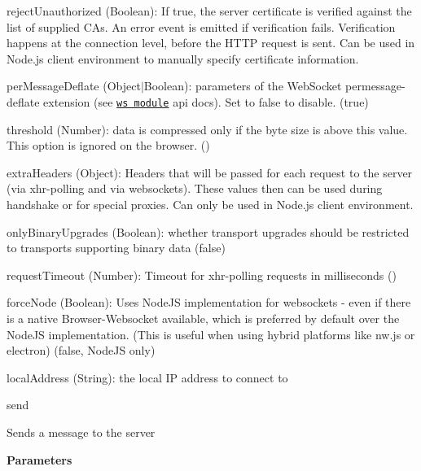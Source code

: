 \begin{DoxyItemize}
\begin{DoxyItemize}
\begin{DoxyItemize}
\item {\ttfamily reject\+Unauthorized} ({\ttfamily Boolean})\+: If true, the server certificate is verified against the list of supplied C\+As. An \textquotesingle{}error\textquotesingle{} event is emitted if verification fails. Verification happens at the connection level, before the H\+T\+TP request is sent. Can be used in Node.\+js client environment to manually specify certificate information.
\item {\ttfamily per\+Message\+Deflate} ({\ttfamily Object$\vert$\+Boolean})\+: parameters of the Web\+Socket permessage-\/deflate extension (see \href{https://github.com/einaros/ws}{\tt ws module} api docs). Set to {\ttfamily false} to disable. ({\ttfamily true})
\begin{DoxyItemize}
\item {\ttfamily threshold} ({\ttfamily Number})\+: data is compressed only if the byte size is above this value. This option is ignored on the browser. ({})
\end{DoxyItemize}
\item {\ttfamily extra\+Headers} ({\ttfamily Object})\+: Headers that will be passed for each request to the server (via xhr-\/polling and via websockets). These values then can be used during handshake or for special proxies. Can only be used in Node.\+js client environment.
\item {\ttfamily only\+Binary\+Upgrades} ({\ttfamily Boolean})\+: whether transport upgrades should be restricted to transports supporting binary data ({\ttfamily false})
\item {\ttfamily request\+Timeout} ({\ttfamily Number})\+: Timeout for xhr-\/polling requests in milliseconds ({})
\item {\ttfamily force\+Node} ({\ttfamily Boolean})\+: Uses Node\+JS implementation for websockets -\/ even if there is a native Browser-\/\+Websocket available, which is preferred by default over the Node\+JS implementation. (This is useful when using hybrid platforms like nw.\+js or electron) ({\ttfamily false}, Node\+JS only)
\item {\ttfamily local\+Address} ({\ttfamily String})\+: the local IP address to connect to
\end{DoxyItemize}
\end{DoxyItemize}
\item {\ttfamily send}
\begin{DoxyItemize}
\item Sends a message to the server
\item {\bfseries Parameters}

\end{DoxyItemize}
\end{DoxyItemize}
